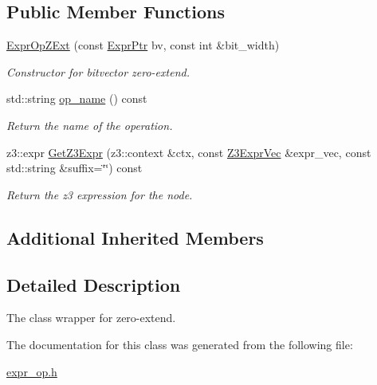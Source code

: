 \subsection*{Public Member Functions}
\begin{DoxyCompactItemize}
\item 
\mbox{\label{classilang_1_1_expr_op_z_ext_ab43b215c04308df7f7db86db10c533f5}} 
\mbox{\hyperlink{classilang_1_1_expr_op_z_ext_ab43b215c04308df7f7db86db10c533f5}{Expr\+Op\+Z\+Ext}} (const \mbox{\hyperlink{classilang_1_1_expr_a85952b6a34620c4c8cab6bac9c9fdf8c}{Expr\+Ptr}} bv, const int \&bit\+\_\+width)
\begin{DoxyCompactList}\small\item\em Constructor for bitvector zero-\/extend. \end{DoxyCompactList}\item 
\mbox{\label{classilang_1_1_expr_op_z_ext_ac0ddfa1510b3e098212db9d56835b386}} 
std\+::string \mbox{\hyperlink{classilang_1_1_expr_op_z_ext_ac0ddfa1510b3e098212db9d56835b386}{op\+\_\+name}} () const
\begin{DoxyCompactList}\small\item\em Return the name of the operation. \end{DoxyCompactList}\item 
\mbox{\label{classilang_1_1_expr_op_z_ext_ace7b236f261271f81cf9bd49685f33b4}} 
z3\+::expr \mbox{\hyperlink{classilang_1_1_expr_op_z_ext_ace7b236f261271f81cf9bd49685f33b4}{Get\+Z3\+Expr}} (z3\+::context \&ctx, const \mbox{\hyperlink{namespaceilang_adc4eee919aa24fff882d03a48d733c19}{Z3\+Expr\+Vec}} \&expr\+\_\+vec, const std\+::string \&suffix=\char`\"{}\char`\"{}) const
\begin{DoxyCompactList}\small\item\em Return the z3 expression for the node. \end{DoxyCompactList}\end{DoxyCompactItemize}
\subsection*{Additional Inherited Members}


\subsection{Detailed Description}
The class wrapper for zero-\/extend. 

The documentation for this class was generated from the following file\+:\begin{DoxyCompactItemize}
\item 
\mbox{\hyperlink{expr__op_8h}{expr\+\_\+op.\+h}}\end{DoxyCompactItemize}
